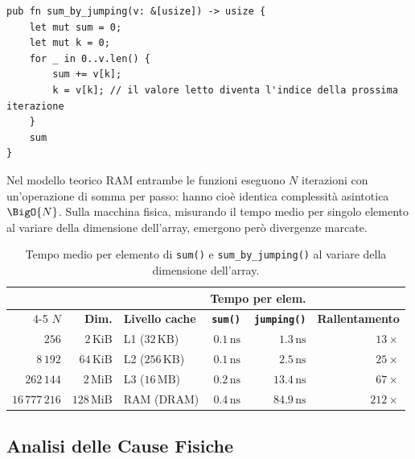 \begin{lstlisting}[style=rustcode,caption={Scansione per salti casuali (\textit{pointer chasing}).}]
pub fn sum_by_jumping(v: &[usize]) -> usize {
    let mut sum = 0;
    let mut k = 0;
    for _ in 0..v.len() {
        sum += v[k];
        k = v[k]; // il valore letto diventa l'indice della prossima iterazione
    }
    sum
}
\end{lstlisting}

Nel modello teorico RAM entrambe le funzioni eseguono $N$ iterazioni con un'operazione di somma per passo: hanno cio\`e identica complessit\`a asintotica $\BigO{N}$. Sulla macchina fisica, misurando il tempo medio per singolo elemento al variare della dimensione dell'array, emergono per\`o divergenze marcate.

\begin{table}[htbp]
  \centering
  \small
  \setlength{\tabcolsep}{6pt}
  \begin{tabular}{r r l r r r}
    \toprule
    & & & \multicolumn{2}{c}{\textbf{Tempo per elem.}} & \\
    \cmidrule(lr){4-5}
    \textbf{$N$} & \textbf{Dim.} & \textbf{Livello cache} & \textbf{\texttt{sum()}} & \textbf{\texttt{jumping()}} & \textbf{Rallentamento} \\
    \midrule
    $256$         & $2\,\text{KiB}$   & L1 ($32\,\text{KB}$)  & $0.1\,\text{ns}$ & $1.3\,\text{ns}$  & $13\times$  \\
    $8\,192$      & $64\,\text{KiB}$  & L2 ($256\,\text{KB}$) & $0.1\,\text{ns}$ & $2.5\,\text{ns}$  & $25\times$  \\
    $262\,144$    & $2\,\text{MiB}$   & L3 ($16\,\text{MB}$)  & $0.2\,\text{ns}$ & $13.4\,\text{ns}$ & $67\times$  \\
    $16\,777\,216$& $128\,\text{MiB}$ & RAM (DRAM)            & $0.4\,\text{ns}$ & $84.9\,\text{ns}$ & $212\times$ \\
    \bottomrule
  \end{tabular}
  \caption{Tempo medio per elemento di \texttt{sum()} e \texttt{sum\_by\_jumping()} al variare della dimensione dell'array.}
  \label{tab:pointer-chasing-benchmark}
\end{table}

\subsection{Analisi delle Cause Fisiche}

